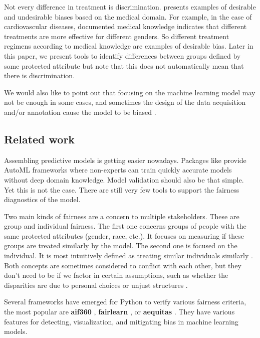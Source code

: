 Not every difference in treatment is discrimination.
\citet{cirillo_sex_2020} presents examples of desirable and undesirable
biases based on the medical domain. For example, in the case of
cardiovascular diseases, documented medical knowledge indicates that
different treatments are more effective for different genders. So
different treatment regimens according to medical knowledge are examples
of desirable bias. Later in this paper, we present tools to identify
differences between groups defined by some protected attribute but note
that this does not automatically mean that there is discrimination.

We would also like to point out that focusing on the machine learning
model may not be enough in some cases, and sometimes the design of the
data acquisition and/or annotation cause the model to be biased
\citep{barocas-hardt-narayanan}.

\hypertarget{related-work}{%
\subsection{Related work}\label{related-work}}

Assembling predictive models is getting easier nowadays. Packages like
 \citep{H2OAutoML} provide AutoML frameworks where
non-experts can train quickly accurate models without deep domain
knowledge. Model validation should also be that simple. Yet this is not
the case. There are still very few tools to support the fairness
diagnostics of the model.

Two main kinds of fairness are a concern to multiple stakeholders. These
are group and individual fairness. The first one concerns groups of
people with the same protected attributes (gender, race, etc.). It
focuses on measuring if these groups are treated similarly by the model.
The second one is focused on the individual. It is most intuitively
defined as treating similar individuals similarly
\citep{statisticalparity}. Both concepts are sometimes considered to
conflict with each other, but they don't need to be if we factor in
certain assumptions, such as whether the disparities are due to personal
choices or unjust structures \citep{reuben}.

Several frameworks have emerged for Python to verify various fairness
criteria, the most popular are \textbf{aif360} \citep{aif360-oct-2018},
\textbf{fairlearn} \citep{bird2020fairlearn}, or \textbf{aequitas}
\citep{2018aequitas}. They have various features for detecting,
visualization, and mitigating bias in machine learning models.

